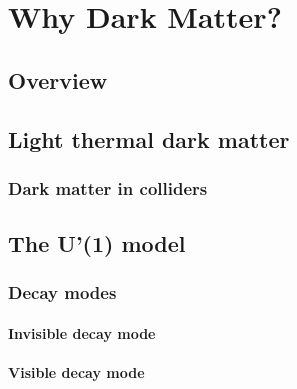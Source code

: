 
\chapter{Why Dark Matter?} %

\label{chapter6}


\section{Overview}

\section{Light thermal dark matter}

\subsection{Dark matter in colliders}

\section{The U'(1) model}

\subsection{Decay modes}

\subsubsection{Invisible decay mode}

\subsubsection{Visible decay mode}

